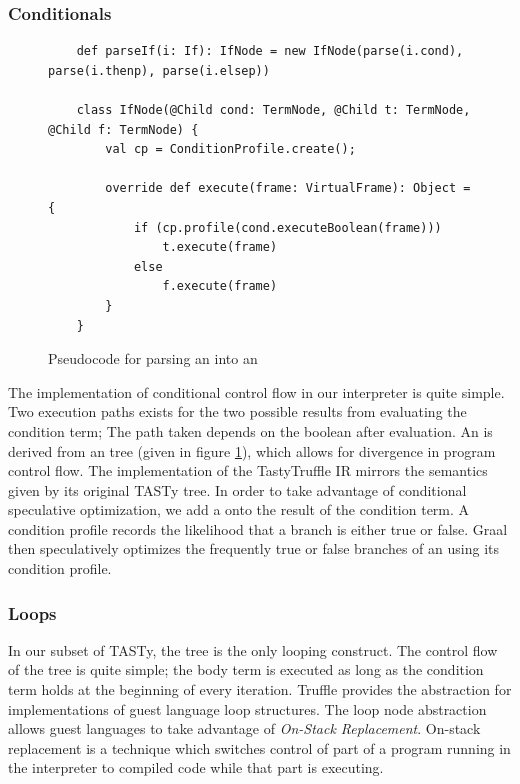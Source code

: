 \subsubsection*{Conditionals}

\begin{figure}[!htb]
	\begin{verbatim}
	def parseIf(i: If): IfNode = new IfNode(parse(i.cond), parse(i.thenp), parse(i.elsep))
		
	class IfNode(@Child cond: TermNode, @Child t: TermNode, @Child f: TermNode) {
		val cp = ConditionProfile.create();
			
		override def execute(frame: VirtualFrame): Object = {
			if (cp.profile(cond.executeBoolean(frame)))
				t.execute(frame)
			else 
				f.execute(frame)		
		}
	}
	\end{verbatim}
	\caption{Pseudocode for parsing an  into an }
	\label{impl:if}
\end{figure}

The implementation of conditional control flow in our interpreter is quite simple.
Two execution paths exists for the two possible results from evaluating the condition term; The path taken depends on the boolean after evaluation.
An  is derived from an  tree (given in figure \ref{impl:if}), which allows for divergence in program control flow.
The implementation of the TastyTruffle IR mirrors the semantics given by its original TASTy tree.
In order to take advantage of conditional speculative optimization, we add a  onto the result of the condition term.
A condition profile records the likelihood that a branch is either true or false.
Graal then speculatively optimizes the frequently true or false branches of an  using its condition profile.

\subsubsection*{Loops}

In our subset of TASTy, the  tree is the only looping construct.
The control flow of the  tree is quite simple; the body term is executed as long as the condition term holds at the beginning of every iteration.
Truffle provides the  abstraction for implementations of guest language loop structures.
The loop node abstraction allows guest languages to take advantage of \textit{On-Stack Replacement}\cite{osr}.
On-stack replacement is a technique which switches control of part of a program running in the interpreter to compiled code while that part is executing.

